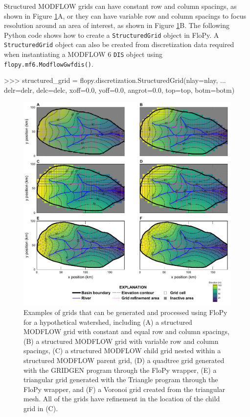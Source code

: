 \documentclass[12pt, oneside]{article}  	%
\begin{document}
Structured MODFLOW grids can have constant row and column spacings, as shown in Figure \ref{fig:grids}A, or they can have variable row and column spacings to focus resolution around an area of interest, as shown in Figure \ref{fig:grids}B. The following Python code shows how to create a \texttt{StructuredGrid} object in FloPy. A \texttt{StructuredGrid} object can also be created from discretization data required when instantiating a MODFLOW 6 \texttt{DIS} object using \texttt{flopy.mf6.ModflowGwfdis()}. 

\begin{python}
>>> structured_grid = flopy.discretization.StructuredGrid(nlay=nlay, 
... delr=delr, delc=delc, xoff=0.0, yoff=0.0, angrot=0.0, top=top, botm=botm)
\end{python}


\begin{figure}[ht!]
	\begin{center}
		\includegraphics{figure1.pdf}
	\end{center}
	\caption{Examples of grids that can be generated and processed using FloPy for a hypothetical watershed, including (A) a structured MODFLOW grid with constant and equal row and column spacings, (B) a structured MODFLOW grid with variable row and column spacings, (C) a structured MODFLOW child grid nested within a structured MODFLOW parent grid, (D) a quadtree grid generated with the GRIDGEN program \citep{gridgen} through the FloPy wrapper, (E) a triangular grid generated with the Triangle program \citep{trianglemesh} through the FloPy wrapper, and (F) a Voronoi grid created from the triangular mesh. All of the grids have refinement in the location of the child grid in (C).}
	\label{fig:grids}
\end{figure}
\end{document}
